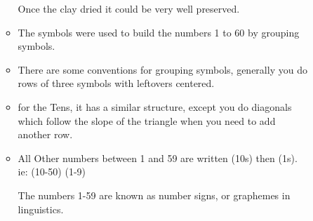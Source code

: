 \documentclass{report}
\begin{document}
\begin{description}
\begin{mdframed}
\begin{itemize}
\begin{itemize}
\begin{mdframed}
                                Once the clay dried it could be very well preserved.
                            \end{mdframed}
                        \item The symbols were used to build the
                            numbers 1 to 60 by grouping symbols.
                        \item There are some conventions for
                            grouping symbols, generally you do rows
                            of three symbols with leftovers centered.
                        \item for the Tens, it has a similar structure,
                            except you do diagonals which follow the slope
                            of the triangle when you need to add
                            another row.
                        \item All Other numbers between 1 and 59
                            are written (10s) then (1s).
                            ie: (10-50) (1-9)
                            \begin{mdframed}
                                The numbers 1-59 are known as
                                number signs, or graphemes in linguistics.


\end{mdframed}
\end{itemize}
\end{itemize}
\end{mdframed}
\end{description}
\end{document}
